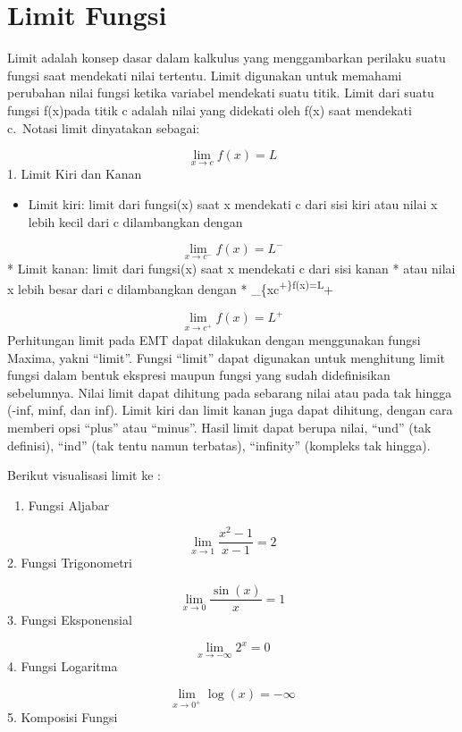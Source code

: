 \documentclass[
]{book}
\providecommand{\tightlist}{%
  \setlength{\itemsep}{0pt}\setlength{\parskip}{0pt}}
\begin{document}
\section{Limit Fungsi}\label{limit-fungsi}

Limit adalah konsep dasar dalam kalkulus yang menggambarkan perilaku suatu fungsi saat mendekati nilai tertentu. Limit digunakan untuk memahami perubahan nilai fungsi ketika variabel mendekati suatu titik. Limit dari suatu fungsi f(x)pada titik c adalah nilai yang didekati oleh f(x) saat mendekati c.~Notasi limit dinyatakan sebagai:

\[\lim_{x\to c}f(x)=L\]1. Limit Kiri dan Kanan

\begin{itemize}
\tightlist
\item
  Limit kiri: limit dari fungsi(x) saat x mendekati c dari sisi kiri atau nilai x lebih kecil dari c dilambangkan dengan
\end{itemize}

\[\lim_{x\to c^-}f(x)=L^-\]* Limit kanan: limit dari fungsi(x) saat x mendekati c dari sisi kanan * atau nilai x lebih besar dari c dilambangkan dengan * \lim\_\{x\to c\textsuperscript{+\}f(x)=L}+

\[\lim_{x\to c^+}f(x)=L^+\]Perhitungan limit pada EMT dapat dilakukan dengan menggunakan fungsi Maxima, yakni ``limit''. Fungsi ``limit'' dapat digunakan untuk menghitung limit fungsi dalam bentuk ekspresi maupun fungsi yang sudah didefinisikan sebelumnya. Nilai limit dapat dihitung pada sebarang nilai atau pada tak hingga (-inf, minf, dan inf). Limit kiri dan limit kanan juga dapat dihitung, dengan cara memberi opsi ``plus'' atau ``minus''. Hasil limit dapat berupa nilai, ``und'' (tak definisi), ``ind'' (tak tentu namun terbatas), ``infinity'' (kompleks tak hingga).

Berikut visualisasi limit ke :

\begin{enumerate}
\def\labelenumi{\arabic{enumi}.}
\tightlist
\item
  Fungsi Aljabar
\end{enumerate}

\[\lim_{x \to 1} \frac{x^2 - 1}{x - 1} = 2\]2. Fungsi Trigonometri

\[\lim_{x \to 0} \frac{\sin(x)}{x} = 1\]3. Fungsi Eksponensial

\[\lim_{x \to -\infty} 2^x = 0\]4. Fungsi Logaritma

\[\lim_{x \to 0^+} \log(x) = -\infty\]5. Komposisi Fungsi
\end{document}
